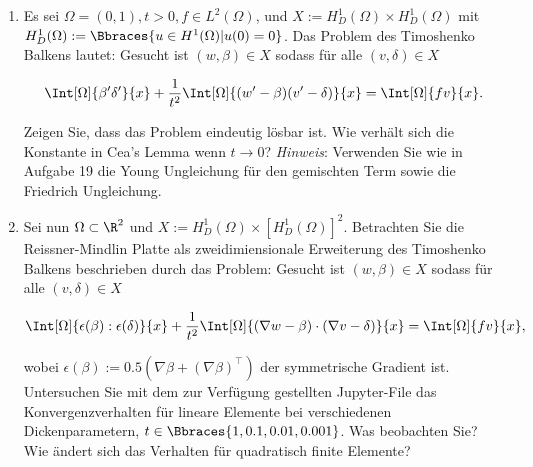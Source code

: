 
\begin{exercise}

\phantom{}

\begin{enumerate}[label = \textbf{\alph*)}]

  \item Es sei $\Omega = (0,1), t >0, f \in L^2(\Omega)$, und $X := H^1_D(\Omega) \times H^1_D(\Omega)$ mit $H^1_D(\Omega) := \Bbraces{u \in H^1(\Omega) | u(0) = 0}$.
  Das Problem des Timoshenko Balkens lautet:
  Gesucht ist $(w, \beta) \in X$ sodass für alle $(v, \delta) \in X$

  \begin{align}
    \Int[\Omega]{\beta^\prime \delta^\prime}{x}
    +
    \frac{1}{t^2} \Int[\Omega]{(w^\prime - \beta)(v^\prime - \delta)}{x}
    =
    \Int[\Omega]{f v}{x}.
  \end{align}

  Zeigen Sie, dass das Problem eindeutig lösbar ist. Wie verhält sich die Konstante in Cea's Lemma wenn $t \to 0$?
  \textit{Hinweis}:
  Verwenden Sie wie in Aufgabe 19 die Young Ungleichung für den gemischten Term sowie die Friedrich Ungleichung.

  \item Sei nun $\Omega \subset \R^2$ und $X := H^1_D(\Omega) \times [H^1_D(\Omega)]^2$.
  Betrachten Sie die Reissner-Mindlin Platte als zweidimiensionale Erweiterung des Timoshenko Balkens beschrieben durch das Problem:
  Gesucht ist $(w, \beta) \in X$ sodass für alle $(v, \delta) \in X$

  \begin{align}
    \Int[\Omega]{\epsilon(\beta):\epsilon(\delta)}{x}
    +
    \frac{1}{t^2} \Int[\Omega]{(\nabla w - \beta) \cdot (\nabla v - \delta)}{x}
    =
    \Int[\Omega]{f v}{x},
  \end{align}

  wobei $\epsilon(\beta) := 0.5 (\nabla \beta + (\nabla \beta)^\top)$ der symmetrische Gradient ist.
  Untersuchen Sie mit dem zur Verfügung gestellten Jupyter-File das Konvergenzverhalten für lineare Elemente bei verschiedenen Dickenparametern, $t \in \Bbraces{1, 0.1, 0.01, 0.001}$.
  Was beobachten Sie?
  Wie ändert sich das Verhalten für quadratisch finite Elemente?

\end{enumerate}

\end{exercise}

